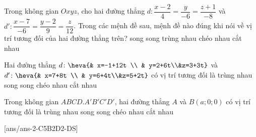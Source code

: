 \begin{ex}%
	Trong không gian $Oxyz$, cho hai đường thẳng $d\colon \dfrac{x-2}{4}=\dfrac{y}{-6}=\dfrac{z+1}{-8}$ và $d'\colon \dfrac{x-7}{-6}=\dfrac{y-2}{9}=\dfrac{z}{12}$. Trong các mệnh đề sau, mệnh đề nào đúng khi nói về vị trí tương đối của hai đường thẳng trên?
	\choice
	{\True song song}
	{trùng nhau}
	c{héo nhau}
	{cắt nhau}
\end{ex}
\begin{ex}%
	Hai đường thẳng $d\colon \heva{& x=-1+12t \\ & y=2+6t\\&z=3+3t}$ và $d'\colon\heva{& x=7+8t \\ & y=6+4t\\&z=5+2t}$ có vị trí tương đối là
	\choice
	{\True trùng nhau}
	{song song}
	{chéo nhau}
	{cắt nhau}
\end{ex}
\begin{ex}%
	Trong không gian $ABCD.A'B'C'D'$, hai đường thẳng $A$ và $B(a;0;0)$ có vị trí tương đối là
	\choice
	{trùng nhau}
	{song song}
	{chéo nhau}
	{\True cắt nhau}
\end{ex}
\TNTF
{}[ans/ans-2-C5B2D2-DS]
